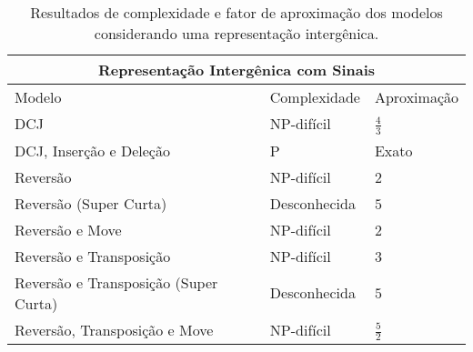 \begin{table}[!htb]
  \caption{Resultados de complexidade e fator de aproximação dos modelos considerando uma representação intergênica.}
  \label{table:GNCKDPJY}
  \centering
  \begin{tabular}{|p{8cm}|p{3cm}|p{3cm}|}
    \hline
    \multicolumn{3}{|c|}{Representação Intergênica com Sinais}                                                                                   \\ \hline
    Modelo                                  & Complexidade                                 & Aproximação                                         \\ \hline
    DCJ                                     & NP-difícil~\cite{2017-fertin-etal}           & $\frac{4}{3}$~\cite{2017-fertin-etal}               \\ \hline
    DCJ, Inserção e Deleção                 & P~\cite{2016b-bulteau-etal}                  & Exato~\cite{2016b-bulteau-etal}                     \\ \hline
    Reversão                                & NP-difícil~\cite{2021b-oliveira-etal}        & $2$~\cite{2021b-oliveira-etal}                      \\ \hline
    Reversão (Super Curta)                  & Desconhecida                                 & $5$~\cite{2019c-oliveira-etal}                      \\ \hline
    Reversão e Move                         & NP-difícil~\cite{2022b-brito-etal}           & $2$~\cite{2022b-brito-etal}                         \\ \hline
    Reversão e Transposição                 & NP-difícil~\cite{2021a-oliveira-etal}        & $3$~\cite{2021b-oliveira-etal}                      \\ \hline
    Reversão e Transposição (Super Curta)   & Desconhecida                                 & $5$~\cite{2019c-oliveira-etal}                      \\ \hline
    Reversão, Transposição e Move           & NP-difícil~\cite{2021a-oliveira-etal}        & $\frac{5}{2}$~\cite{2021a-oliveira-etal}            \\ \hline
  \end{tabular}

  \hfill \break


\end{table}
